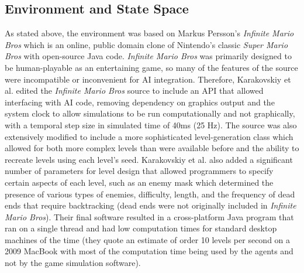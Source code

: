\documentclass[12pt]{article}
\begin{document}
\begin{multicols}{2}
\section * {Environment and State Space}
As stated above, the environment was based on Markus Persson's \textit{Infinite Mario Bros} which is an online,
public domain clone of Nintendo's classic \textit{Super Mario Bros} with open-source Java code. \textit{Infinite Mario Bros}
was primarily designed to be human-playable as an entertaining game, so many of the features of the source were incompatible 
or inconvenient for AI integration. Therefore, Karakovskiy et al. edited the \textit{Infinite Mario Bros} source to include an 
API that allowed interfacing with AI code, removing dependency on graphics output and the system clock to allow simulations 
to be run computationally and not graphically, with a temporal step size in simulated time of 40ms (25 Hz). 
The source was also extensively modified to include a more sophisticated level-generation class which allowed for both 
more complex levels than were available before and the ability to recreate levels using each level's seed. Karakovskiy et al. 
also added a significant number of parameters for level design that allowed programmers to specify certain aspects of each level, 
such as an enemy mask which determined the presence of various types of enemies, difficulty, length, and the frequency of dead 
ends that require backtracking (dead ends were not originally included in \textit{Infinite Mario Bros}). Their final software resulted in a 
cross-platform Java program that ran on a single thread and had low computation times for standard desktop machines of the time 
(they quote an estimate of order 10 levels per second on a 2009 MacBook with most of the computation time being used by the 
agents and not by the game simulation software).


\end{multicols}
\end{document}
